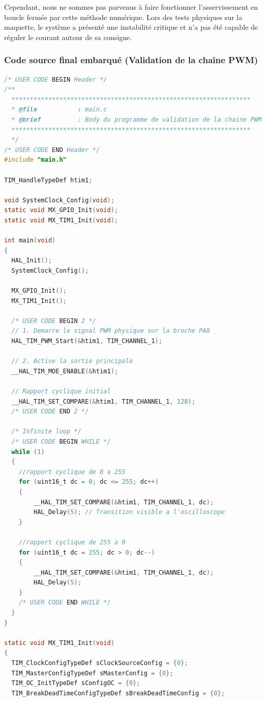 \documentclass[11pt]{report}
\begin{document}
Cependant, nous ne sommes pas parvenus à faire fonctionner l'asservissement en boucle fermée par cette méthode numérique. Lors des tests physiques sur la maquette, le système a présenté une instabilité critique et n'a pas été capable de réguler le courant autour de sa consigne.

\subsubsection{Code source final embarqué (Validation de la chaîne PWM)}
\begin{lstlisting}[language=C, caption={fichier main.c en BO}, label={code:main_final}]
/* USER CODE BEGIN Header */
/**
  *****************************************************************
  * @file           : main.c
  * @brief          : Body du programme de validation de la chaine PWM
  *****************************************************************
  */
/* USER CODE END Header */
#include "main.h"

TIM_HandleTypeDef htim1;

void SystemClock_Config(void);
static void MX_GPIO_Init(void);
static void MX_TIM1_Init(void);

int main(void)
{
  HAL_Init();
  SystemClock_Config();

  MX_GPIO_Init();
  MX_TIM1_Init();

  /* USER CODE BEGIN 2 */
  // 1. Demarre le signal PWM physique sur la broche PA8
  HAL_TIM_PWM_Start(&htim1, TIM_CHANNEL_1);

  // 2. Active la sortie principale 
  __HAL_TIM_MOE_ENABLE(&htim1);

  // Rapport cyclique initial
  __HAL_TIM_SET_COMPARE(&htim1, TIM_CHANNEL_1, 128);
  /* USER CODE END 2 */

  /* Infinite loop */
  /* USER CODE BEGIN WHILE */
  while (1)
  {
    //rapport cyclique de 0 a 255
    for (uint16_t dc = 0; dc <= 255; dc++)
    {
        __HAL_TIM_SET_COMPARE(&htim1, TIM_CHANNEL_1, dc);
        HAL_Delay(5); // Transition visible a l'oscilloscope
    }

    //rapport cyclique de 255 a 0
    for (uint16_t dc = 255; dc > 0; dc--)
    {
        __HAL_TIM_SET_COMPARE(&htim1, TIM_CHANNEL_1, dc);
        HAL_Delay(5);
    }
    /* USER CODE END WHILE */
  }
}

static void MX_TIM1_Init(void)
{
  TIM_ClockConfigTypeDef sClockSourceConfig = {0};
  TIM_MasterConfigTypeDef sMasterConfig = {0};
  TIM_OC_InitTypeDef sConfigOC = {0};
  TIM_BreakDeadTimeConfigTypeDef sBreakDeadTimeConfig = {0};


\end{lstlisting}
\end{document}
